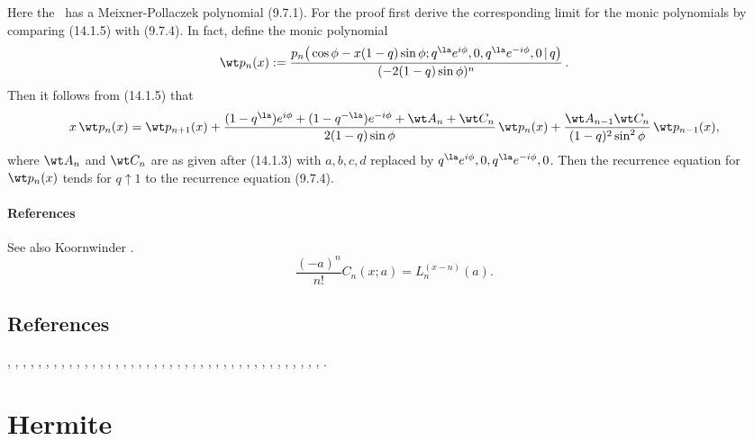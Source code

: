 \documentclass[envcountchap,graybox]{svmono}
\newcounter{rom}
\begin{document}
Here the \RHS\ has a Meixner-Pollaczek polynomial (9.7.1).
For the proof first derive the corresponding limit for the monic polynomials by comparing
(14.1.5) with (9.7.4).
In fact, define the monic polynomial
\[
\wt p_n(x):=
\frac{p_n\big(\cos\phi-x(1-q)\sin\phi;
q^\la e^{i\phi},0,q^\la e^{-i\phi},0\,|\, q\big)}{(-2(1-q)\sin\phi)^n}\,.
\]
Then it follows from (14.1.5) that
\begin{equation*}
x\,\wt p_n(x)=\wt p_{n+1}(x)
+\frac{(1-q^\la)e^{i\phi}+(1-q^{-\la})e^{-i\phi}+\wt A_n+\wt C_n}
{2(1-q)\sin\phi}\,\wt p_n(x)\\
+\frac{\wt A_{n-1} \wt C_n}{(1-q)^2 \sin^2\phi}\,\wt p_{n-1}(x),
\end{equation*}
where $\wt A_n$ and $\wt C_n$ are as given after (14.1.3) with $a,b,c,d$ replaced by
$q^\la e^{i\phi},0,q^\la e^{-i\phi},0$.
Then the recurrence equation for $\wt p_n(x)$ tends for $q\uparrow 1$ to
the recurrence equation (9.7.4).
%
\paragraph{References}
See also Koornwinder \cite{K7}.
$$\frac{(-a)^n}{n!}C_n(x;a)=L_n^{(x-n)}(a).$$

\subsection*{References}
\cite{Allaway76}, \cite{NAlSalam66}, \cite{AlSalam90}, \cite{AlSalamChihara76},
\cite{AlSalamIsmail76}, \cite{AndrewsAskey85}, \cite{Area+II}, \cite{Askey75},
\cite{AskeyGasper77}, \cite{AskeyWilson85}, \cite{AtakRahmanSuslov}, \cite{Bavinck98},
\cite{BavinckKoekoek}, \cite{Chihara78}, \cite{Chihara79}, \cite{Dunkl76}, \cite{Erdelyi+},
\cite{Gasper73I}, \cite{Gasper74}, \cite{Goh}, \cite{HoareRahman}, \cite{IsmailLetVal88},
\cite{Koekoek2000}, \cite{Koorn88}, \cite{Krasikov2002}, \cite{LabelleYehI},
\cite{LabelleYehII}, \cite{LabelleYehIII}, \cite{Lesky62}, \cite{Lesky89}, \cite{Lesky94I},
\cite{Lesky95II}, \cite{LewanowiczII}, \cite{LopezTemme2004}, \cite{Meixner}, \cite{Nikiforov+},
\cite{NikiforovUvarov}, \cite{Szafraniec}, \cite{Szego75}, \cite{Viennot}, \cite{Zarzo+},
\cite{Zeng90}.


\section{Hermite}

\par\setcounter{equation}{0}
\end{document}
